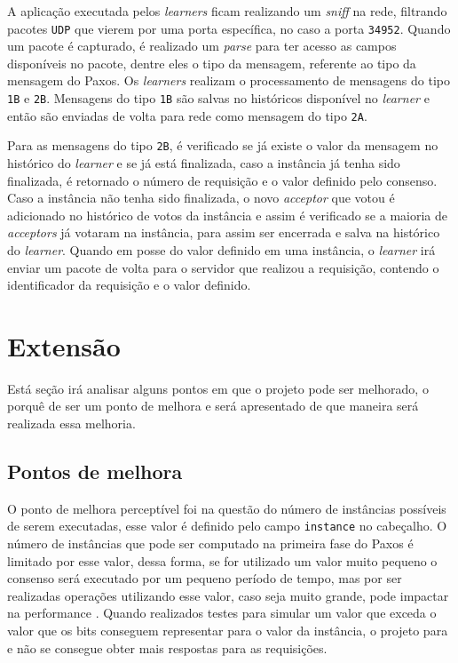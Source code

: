 \documentclass[
    12pt,
    openright, 
    oneside,
    a4paper,
    french,
    english,
    brazil
    ]{facom-ufu-abntex2}
\theoremstyle{definition}
\begin{document}
A aplicação executada pelos \emph{learners} ficam realizando um \emph{sniff} na rede, filtrando pacotes
\texttt{UDP} que vierem por uma porta específica, no caso a porta \texttt{34952}. Quando um
pacote é capturado, é realizado um \emph{parse} para ter acesso as campos disponíveis no pacote, dentre
eles o tipo da mensagem, referente ao tipo da mensagem do Paxos. Os \emph{learners} realizam o processamento
de mensagens do tipo \texttt{1B} e \texttt{2B}. Mensagens do tipo \texttt{1B} são salvas no históricos
disponível no \emph{learner} e então são enviadas de volta para rede como mensagem do tipo \texttt{2A}.

Para as mensagens do tipo \texttt{2B}, é verificado se já existe o valor da mensagem no histórico
do \emph{learner} e se já está finalizada, caso a instância já tenha sido finalizada, é retornado o
número de requisição e o valor definido pelo consenso. Caso a instância não tenha sido finalizada,
o novo \emph{acceptor} que votou é adicionado no histórico de votos da instância e assim é verificado
se a maioria de \emph{acceptors} já votaram na instância, para assim ser encerrada e salva na histórico
do \emph{learner}. Quando em posse do valor definido em uma instância, o \emph{learner} irá enviar um pacote de 
volta para o servidor que realizou a requisição, contendo o identificador da requisição e o valor definido.

\section{Extensão}
Está seção irá analisar alguns pontos em que o projeto pode ser melhorado, o porquê de ser um ponto de
melhora e será apresentado de que maneira será realizada essa melhoria.

\subsection{Pontos de melhora}
O ponto de melhora perceptível foi na questão do número de instâncias possíveis de serem executadas,
esse valor é definido pelo campo \texttt{instance} no cabeçalho. O número de instâncias que pode ser 
computado na primeira fase do Paxos é limitado por esse valor, dessa forma, se for utilizado um valor
muito pequeno o consenso será executado por um pequeno período de tempo, mas por ser realizadas operações
utilizando esse valor, caso seja muito grande, pode impactar na performance \cite{dang2016paxos}. 
Quando realizados testes para simular um valor que exceda o valor que os bits conseguem representar 
para o valor da instância, o projeto para e não se consegue obter mais respostas para as requisições.
\end{document}
